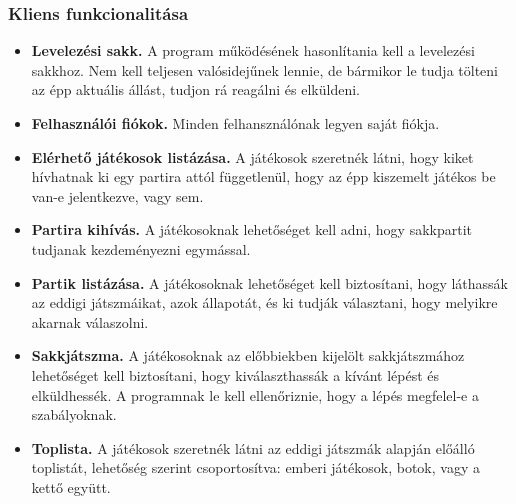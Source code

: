 \documentclass[twoside, a4paper, 12pt]{book}
\begin{document}
\subsubsection{Kliens funkcionalitása}
\begin{itemize}
	\item \textbf{Levelezési sakk.} A program működésének hasonlítania kell a levelezési sakkhoz. Nem kell teljesen valósidejűnek lennie, de bármikor le tudja tölteni az épp aktuális állást, tudjon rá reagálni és elküldeni.
	
	\item \textbf{Felhasználói fiókok.} Minden felhansználónak legyen saját fiókja.
	
	\item \textbf{Elérhető játékosok listázása.} A játékosok szeretnék látni, hogy kiket hívhatnak ki egy partira attól függetlenül, hogy az épp kiszemelt játékos be van-e jelentkezve, vagy sem.
	
	\item \textbf{Partira kihívás.} A játékosoknak lehetőséget kell adni, hogy sakkpartit tudjanak kezdeményezni egymással.
	
	\item \textbf{Partik listázása.} A játékosoknak lehetőséget kell biztosítani, hogy láthassák az eddigi játszmáikat, azok állapotát, és ki tudják választani, hogy melyikre akarnak válaszolni.
	
	\item \textbf{Sakkjátszma.} A játékosoknak az előbbiekben kijelölt sakkjátszmához lehetőséget kell biztosítani, hogy kiválaszthassák a kívánt lépést és elküldhessék. A programnak le kell ellenőriznie, hogy a lépés megfelel-e a szabályoknak.
	
	\item \textbf{Toplista.} A játékosok szeretnék látni az eddigi játszmák alapján előálló toplistát, lehetőség szerint csoportosítva: emberi játékosok, botok, vagy a kettő együtt.
\end{itemize}

\end{document}
